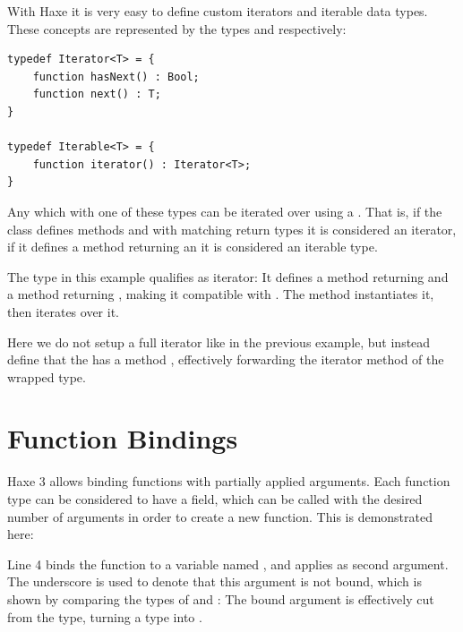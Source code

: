 \documentclass{haxe}
\begin{document}
With Haxe it is very easy to define custom iterators and iterable data types. These concepts are represented by the types  and  respectively:

\begin{lstlisting}
typedef Iterator<T> = {
	function hasNext() : Bool;
	function next() : T;
}

typedef Iterable<T> = {
	function iterator() : Iterator<T>;
}
\end{lstlisting}

Any  which  with one of these types can be iterated over using a . That is, if the class defines methods  and  with matching return types it is considered an iterator, if it defines a method  returning an  it is considered an iterable type.


The type  in this example qualifies as iterator: It defines a method  returning  and a method  returning , making it compatible with . The  method instantiates it, then iterates over it.


Here we do not setup a full iterator like in the previous example, but instead define that the  has a method , effectively forwarding the iterator method of the wrapped  type. 



\section{Function Bindings}
\label{lf-function-bindings}

Haxe 3 allows binding functions with partially applied arguments. Each function type can be considered to have a  field, which can be called with the desired number of arguments in order to create a new function. This is demonstrated here:

Line 4 binds the function  to a variable named , and applies  as second argument. The underscore \expr{_} is used to denote that this argument is not bound, which is shown by comparing the types of  and : The bound  argument is effectively cut from the type, turning a  type into .
\end{document}

